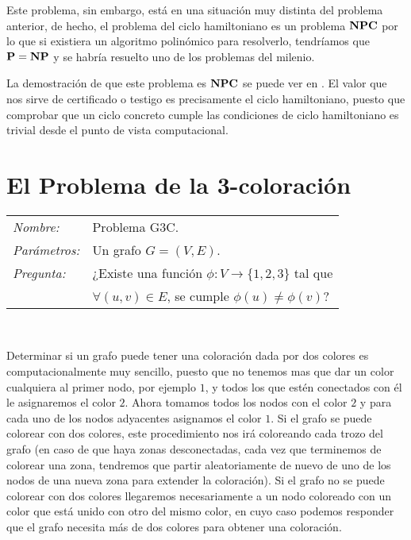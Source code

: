 Este problema, sin embargo, est\'a en una situaci\'on muy distinta del problema anterior,
de hecho, el problema del ciclo hamiltoniano es un problema ${\bf NPC}$ por lo que si existiera un algoritmo
polin\'omico para resolverlo, tendr\'iamos que ${\bf P} = {\bf NP}$ y se habr\'ia resuelto uno de los problemas
del milenio.

La demostraci\'on de que este problema es ${\bf NPC}$ se puede ver en
\cite[Section 34.5.3]{algoBB}. El valor que nos sirve de certificado o testigo es precisamente el ciclo hamiltoniano, puesto que
comprobar que un ciclo concreto cumple las condiciones de ciclo hamiltoniano es trivial desde el punto de vista computacional.

\section{El Problema de la 3-coloración}

\hfil

\begin{tabular}{|ll}\label{problemaG3C}\index{Problema 3-coloración}\index{G3C}
	\textit{Nombre:} & Problema G3C. \\
	\textit{Parámetros:} &Un grafo $G=(V,E)$. \\
	\textit{Pregunta:} & ¿Existe una función
	$\phi : V \to \{1,2,3\}$ tal que \\ & $\forall (u,v)\in E$, se cumple $\phi(u)\neq \phi(v)$? \\
\end{tabular}
\\

\hfil

Determinar si un grafo puede tener una coloraci\'on dada por dos colores es
computacionalmente muy sencillo, puesto que no tenemos
mas que dar un color cualquiera al primer nodo, por ejemplo $1$, y todos los
que est\'en conectados con \'el le asignaremos el color $2$.
Ahora tomamos todos los nodos con el color $2$ y para cada uno de los nodos
adyacentes asignamos el color $1$. Si el grafo se puede colorear
con dos colores, este procedimiento nos ir\'a coloreando cada trozo del grafo
(en caso de que haya zonas desconectadas, cada vez que terminemos de colorear una zona,
tendremos que  partir aleatoriamente de nuevo de uno de los nodos de una nueva
zona para extender la coloraci\'on). Si el grafo no se puede colorear con dos colores
llegaremos necesariamente a un nodo coloreado con un color que est\'a unido con
otro del mismo color, en cuyo caso podemos responder
que el grafo necesita m\'as de dos colores para obtener una coloraci\'on.


